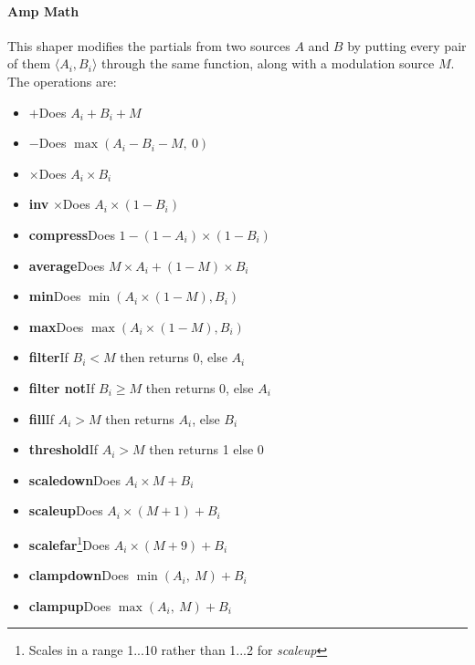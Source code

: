 \documentclass{article}
\begin{document}


\enlargethispage{1em}

\paragraph{Amp Math}  This shaper modifies the partials from two sources \(A\) and \(B\) by putting every pair of them \(\langle A_i, B_i\rangle\) through the same function, along with a modulation source \(M\).  The operations are:

\begin{itemize}
\item \(\boldsymbol{+}\)\quad Does \(A_i + B_i + M\)
\item \(\boldsymbol -\)\quad Does \(\max(A_i - B_i - M,\ 0)\)
\item \(\boldsymbol \times\)\quad Does \(A_i \times B_i\)
\item {\bf inv} \(\boldsymbol \times\)\quad Does \(A_i \times (1 - B_i)\)
\item {\bf compress}\quad Does \(1 - (1 - A_i) \times (1 - B_i)\)
\item {\bf average}\quad Does \(M \times A_i + (1 - M) \times B_i\)
\item {\bf min}\quad Does \(\min(A_i \times (1 - M), B_i)\)
\item {\bf max}\quad Does \(\max(A_i \times (1 - M), B_i)\)
\item {\bf filter}\quad If \(B_i < M\) then returns 0, else \(A_i\)
\item {\bf filter not}\quad  If \(B_i \geq M\) then returns 0, else \(A_i\)
\item {\bf fill}\quad If \(A_i > M\) then returns \(A_i\), else \(B_i\)
\item {\bf threshold}\quad If \(A_i > M\) then returns 1 else 0
\item {\bf scaledown}\quad Does \(A_i \times M + B_i\)
\item {\bf scaleup}\quad Does \(A_i \times (M + 1) + B_i\)
\item {\bf scalefar}\footnote{Scales in a range 1...10 rather than 1...2 for {\it scaleup}}\quad Does \(A_i \times (M + 9) + B_i\)
\item {\bf clampdown}\quad Does \(\min(A_i,\ M) + B_i\)
\item {\bf clampup}\quad Does \(\max(A_i,\ M) + B_i\)
\end{itemize}
\end{document}
